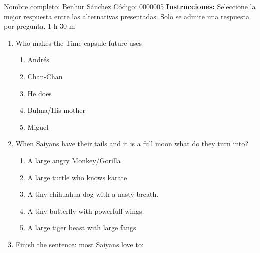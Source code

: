 \documentclass[letterpaper,addpoints,answers,twocolumn,10pt]{exam}
\begin{document}
\noindent Nombre completo: Benhur Sánchez
\newline \newline \newline \newline
Código: 0000005\newline \newline 
{\bf Instrucciones:} Seleccione la mejor respuesta entre las alternativas presentadas. Solo se admite una respuesta por pregunta.
 1 h 30 m

\begin{enumerate}[leftmargin=.2in]




\item  Who makes the Time capsule future uses


\begin{enumerate}[noitemsep,leftmargin=0in]


\item  Andrés
\item  Chan-Chan
\item  He does
\item  Bulma/His mother
\item  Miguel


\end{enumerate}



\item  When Saiyans have their tails and it is a full moon what do they turn into?


\begin{enumerate}[noitemsep,leftmargin=0in]


\item  A large angry Monkey/Gorilla
\item  A large turtle who knows karate
\item  A tiny chihuahua dog with a nasty breath.
\item  A tiny butterfly with powerfull wings.
\item  A large tiger beast with large fangs


\end{enumerate}



\item  Finish the sentence: most Saiyans love to:


\begin{enumerate}[noitemsep,leftmargin=0in]



\end{enumerate}
\end{enumerate}
\end{document}
